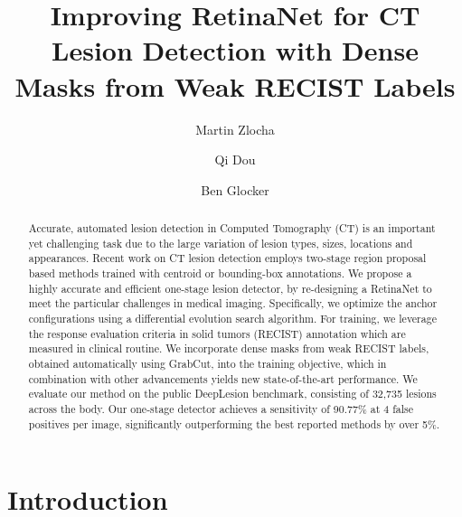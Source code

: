 \documentclass[runningheads,a4paper]{llncs}
\begin{document}
\mainmatter  \title{Improving RetinaNet for CT Lesion Detection with Dense Masks from Weak RECIST Labels}

\newif\ifreview


\ifreview
\author{Paper ID 338}
\institute{}
\else
\author{Martin Zlocha \and Qi Dou \and Ben Glocker}
\fi

\maketitle



\begin{abstract}
 Accurate, automated lesion detection in Computed Tomography (CT) is an important yet challenging task due to the large variation of lesion types, sizes, locations and appearances. Recent work on CT lesion detection employs two-stage region proposal based methods trained with centroid or bounding-box annotations. We propose a highly accurate and efficient one-stage lesion detector, by re-designing a RetinaNet to meet the particular challenges in medical imaging. Specifically, we optimize the anchor configurations using a differential evolution search algorithm. For training, we leverage the response evaluation criteria in solid tumors (RECIST) annotation which are measured in clinical routine. We incorporate dense masks from weak RECIST labels, obtained automatically using GrabCut, into the training objective, which in combination with other advancements yields new state-of-the-art performance. We evaluate our method on the public DeepLesion benchmark, consisting of 32,735 lesions across the body. Our one-stage detector achieves a sensitivity of 90.77\% at 4 false positives per image, significantly outperforming the best reported methods by over 5\%.
\end{abstract}
 
\section{Introduction}
\label{sec:introduction}
\end{document}
